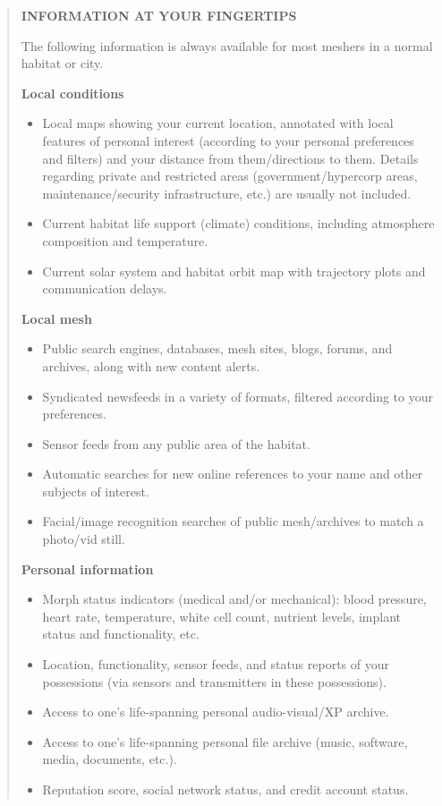 \begin{quote}
   \textbf{INFORMATION AT YOUR FINGERTIPS}

   The following information is always available for most meshers in a normal
   habitat or city.


   \textbf{Local conditions}
   \begin{itemize}
      \item Local maps showing your current location, annotated with local
         features of personal interest (according to your personal preferences
         and filters) and your distance from them/directions to them. Details
         regarding private and restricted areas (government/hypercorp areas,
         maintenance/security infrastructure, etc.) are usually not included.

      \item Current habitat life support (climate) conditions, including
         atmosphere composition and temperature.

      \item Current solar system and habitat orbit map with trajectory plots
         and communication delays.
   \end{itemize}


   \textbf{Local mesh}
   \begin{itemize}
      \item Public search engines, databases, mesh sites, blogs, forums, and
         archives, along with new content alerts.
      \item Syndicated newsfeeds in a variety of formats, filtered according
         to your preferences.
      \item Sensor feeds from any public area of the habitat.
      \item Automatic searches for new online references to your name and other
         subjects of interest.
      \item Facial/image recognition searches of public mesh/archives to
         match a photo/vid still.
   \end{itemize}


   \textbf{Personal information}
   \begin{itemize}
      \item Morph status indicators (medical and/or mechanical): blood
         pressure, heart rate, temperature, white cell count, nutrient
         levels, implant status and functionality, etc.
      \item Location, functionality, sensor feeds, and status reports of
         your possessions (via sensors and transmitters in these possessions).
      \item Access to one's life-spanning personal audio-visual/XP archive.
      \item Access to one's life-spanning personal file archive (music,
         software, media, documents, etc.).
      \item Reputation score, social network status, and credit account
         status.
   \end{itemize}
\end{quote}


